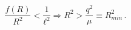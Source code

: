 \begin{equation}\frac{f(R)}{R^2}<\frac{1}{\ell^2} \Longrightarrow 
R^2>\frac{q^2}{\mu}\equiv R_{min}^2\,.\end{equation}

